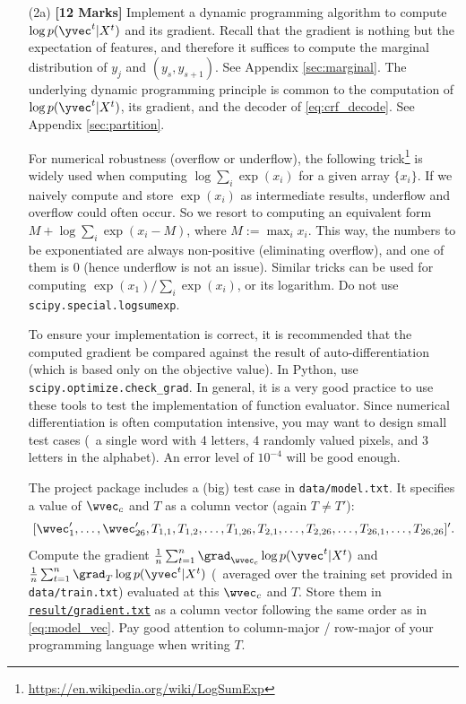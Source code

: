 \documentclass[11pt]{report}
\begin{document}
\begin{itemize}
	\item[(2a)] {\bf [12 Marks]} Implement a dynamic programming algorithm to compute $\log p(\yvec^t | X^t)$ and its gradient.  Recall that the gradient is nothing but the expectation of features, and therefore it suffices to compute the marginal distribution of $y_j$ and $(y_s, y_{s+1})$. See Appendix \ref{sec:marginal}.
	The underlying dynamic programming principle is common to the computation of $\log p(\yvec^t | X^t)$, its gradient, and the decoder of \eqref{eq:crf_decode}.
	See Appendix \ref{sec:partition}.
	
	For numerical robustness (overflow or underflow), the following trick\footnote{\href{https://en.wikipedia.org/wiki/LogSumExp}{\url{https://en.wikipedia.org/wiki/LogSumExp}}} is widely used when computing $\log \sum_i \exp(x_i)$ for a given array $\{x_i\}$.  If we naively compute and store $\exp(x_i)$ as intermediate results, underflow and overflow could often occur.  So we resort to computing an equivalent form $M + \log \sum_i \exp(x_i - M)$, where $M := \max_i x_i$.  This way, the numbers to be exponentiated are always non-positive (eliminating overflow), and one of them is 0 (hence underflow is not an issue).  Similar tricks can be used for computing $\exp(x_1) / \sum_i \exp(x_i)$, or its logarithm.
	Do not use \verb#scipy.special.logsumexp#.
	
	To ensure your implementation is correct, it is recommended that the computed gradient be compared against the result of auto-differentiation (which is based only on the objective value).
	In Python, use \verb#scipy.optimize.check_grad#.	
	In general, it is a very good practice to use these tools to test the implementation of function evaluator.
	Since numerical differentiation is often computation intensive, you may want to design small test cases (\eg\ a single word with 4 letters, 4 randomly valued pixels, and 3 letters in the alphabet).
	An error level of $10^{-4}$ will be good enough.
	
	The project package includes a (big) test case in \verb#data/model.txt#.
	It specifies a value of $\wvec_c$ and $T$ as a column vector (again $T \neq T'$):
	\begin{align}
		\label{eq:model_vec}
		[\wvec'_1, \ldots, \wvec'_{26}, T_{1,1}, T_{1,2}, \ldots, T_{1, 26}, T_{2,1}, \ldots, T_{2, 26}, \ldots, T_{26,1}, \ldots, T_{26, 26}]'.
	\end{align}
	Compute the gradient $\frac{1}{n} \sum_{t=1}^n \grad_{\wvec_c} \log p(\yvec^t | X^t)$ and
	$\frac{1}{n} \sum_{t=1}^n \grad_{T} \log p(\yvec^t | X^t)$
	(\ie\ averaged over the training set provided in \verb#data/train.txt#) evaluated at this $\wvec_c$ and $T$.
	Store them in \underline{\texttt{result/gradient.txt}} as a column vector following the same order as in \eqref{eq:model_vec}.
	Pay good attention to column-major / row-major of your programming language when writing $T$.
	

\end{itemize}
\end{document}

